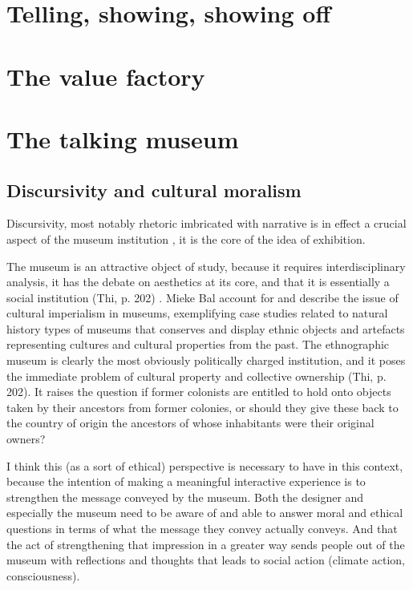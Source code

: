 \section{Telling, showing, showing off}
\section{The value factory}
\section{The talking museum}

\subsection{Discursivity and cultural moralism}
Discursivity, most notably rhetoric imbricated with narrative is in effect a crucial aspect of the museum institution \autocite[p. 205]{Thi_book}, it is the core of the idea of exhibition.

The museum is an attractive object of study, because it requires interdisciplinary analysis, it has the debate on aesthetics at its core, and that it is essentially a social institution (Thi, p. 202) \autocite[p. 202]{Miekebal_book}. Mieke Bal account for and describe the issue of cultural imperialism in museums, exemplifying case studies related to natural history types of museums that conserves and display ethnic objects and artefacts representing cultures and cultural properties from the past. The ethnographic museum is clearly the most obviously politically charged institution, and it poses the immediate problem of cultural property and collective ownership (Thi, p. 202). It raises the question if former colonists are entitled to hold onto objects taken by their ancestors from former colonies, or should they give these back to the country of origin the ancestors of whose inhabitants were their original owners?

I think this (as a sort of ethical) perspective is necessary to have in this context, because the intention of making a meaningful interactive experience is to strengthen the message conveyed by the museum. Both the designer and especially the museum need to be aware of and able to answer moral and ethical questions in terms of what the message they convey actually conveys. And that the act of strengthening that impression in a greater way sends people out of the museum with reflections and thoughts that leads to social action (climate action, consciousness).
